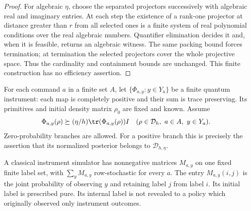 \begin{proof}
For algebraic $\eta$, choose the separated projectors successively with
algebraic real and imaginary entries. At each step the existence of a
rank-one projector at distance greater than $r$ from all selected ones
is a finite system of real polynomial conditions over the real algebraic
numbers. Quantifier elimination decides it and, when it is feasible,
returns an algebraic witness. The same packing bound forces termination;
at termination the selected projectors cover the whole projective space.
Thus the cardinality and containment bounds are unchanged. This finite
construction has no efficiency assertion.
\end{proof}

For each command $a$ in a finite set $A$, let
$\{\Phi_{a,y}:y\in Y_a\}$ be a finite quantum instrument: each map is
completely positive and their sum is trace preserving. Its primitives and
initial density matrix $\rho_0$ are fixed and known. Assume
\begin{equation}\label{eq:r74-posterior-positivity}
 \Phi_{a,y}(\rho)\succeq
       (\eta/h)\tr(\Phi_{a,y}(\rho))I
 \quad(\rho\in\mathcal D_h,\ a\in A,\ y\in Y_a).
\end{equation}
Zero-probability branches are allowed. For a positive branch this is precisely
the assertion that its normalized posterior belongs to
$\mathcal D_{h,\eta}$.

A classical instrument simulator has nonnegative matrices $M_{a,y}$ on one
fixed finite label set, with $\sum_yM_{a,y}$ row-stochastic for every $a$.
The entry $M_{a,y}(i,j)$ is the joint probability of observing $y$ and retaining
label $j$ from label $i$. Its initial label is prescribed pure. Its internal
label is not revealed to a policy which originally observed only instrument
outcomes.

